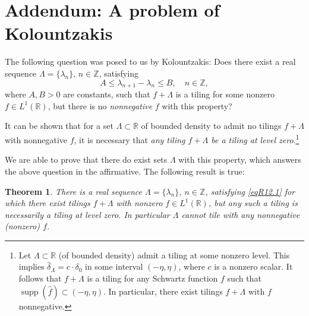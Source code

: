 \documentclass[reqno,a4paper,12pt]{amsart}
\numberwithin{equation}{section}
\numberwithin{figure}{section}
\newcommand\R{\mathbb{R}}
\newcommand\Z{\mathbb{Z}}
\newcommand\lam{\lambda}
\newcommand\Lam{\Lambda}
\newcommand\1{\mathds{1}}
\renewcommand\le{\leqslant}
\newcommand\sbt{\subset}
\newcommand{\ft}[1]{\widehat{#1}}
\newcommand{\supp}{\operatorname{supp}}
\theoremstyle{plain}
\newtheorem{thm}{Theorem}[section]
\theoremstyle{definition}
\begin{document}
\section{Addendum: A problem of Kolountzakis}
\label{secAD1}


The following question was posed to us
by Kolountzakis: Does there exist a real sequence 
$\Lam = \{\lam_n\}$, $n \in \Z$,
satisfying 
 \begin{equation}
\label{eqR12.1}
A \le \lambda_{n+1} - \lam_n \le B, \quad
n \in \Z,
 \end{equation}
where $A,B>0$ are constants, 
such that $f + \Lam$ is a tiling for some  nonzero 
$f \in L^1(\R)$, but there is no \emph{nonnegative}
$f$ with this property?


It  can be shown  that for 
a set $\Lambda \subset \R$  of bounded density 
to admit no tilings $f + \Lam$ with  nonnegative 
$f$, it is necessary that \emph{any tiling $f + \Lam$
be  a tiling at  level  zero}.\footnote{Let
$\Lam \sbt \R$ (of bounded density) admit
a  tiling at some nonzero level.
This implies
 $\ft{\delta}_\Lam = c \cdot \delta_0$
in some interval $(-\eta, \eta)$, 
where $c$ is a nonzero scalar. It follows
that $f + \Lam$ is a tiling 
for any Schwartz function $f$
such that
$\supp(\ft{f}) \sbt (-\eta, \eta)$.
In particular, there exist tilings
$f + \Lam$ with $f$  nonnegative.}



We are able to prove that  there do exist sets $\Lam$ with this 
 property, which answers the above question in 
the affirmative.  The following result is true:

 \begin{thm}
\label{thmR12.2}
There is 
 a real sequence $\Lam = \{\lam_n\}$, $n\in\Z$,
satisfying \eqref{eqR12.1} 
for which
there exist tilings $f + \Lam$
with nonzero
$f \in L^1(\R)$, but  any such a tiling
is necessarily a tiling at  level  zero.
In particular $\Lam$ cannot tile
with any nonnegative (nonzero) $f$.
 \end{thm}
\end{document}
